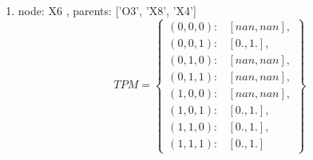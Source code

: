 \documentclass[12pt]{article}
\begin{document}
\begin{enumerate}
\item node: X6
, parents: ['O3', 'X8', 'X4']
$$TPM = \left\{ \begin{array}{ll}(0, 0, 0):& [nan, nan],\\ 
 (0, 0, 1):& [0., 1.],\\ 
 (0, 1, 0):& [nan, nan],\\ 
 (0, 1, 1):& [nan, nan],\\ 
 (1, 0, 0):& [nan, nan],\\ 
 (1, 0, 1):& [0., 1.],\\ 
 (1, 1, 0):& [0., 1.],\\ 
 (1, 1, 1):& [0., 1.]\end{array}\right\}$$
\end{enumerate}





\end{document}

